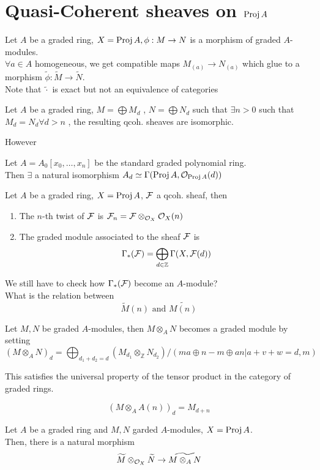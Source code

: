 \documentclass[../main.tex]{subfiles}
\begin{document}
\section{Quasi-Coherent sheaves on $\operatorname{Proj} A$ }
Let $A$ be a graded ring, $X= \operatorname{Proj} A, \phi:M\to N$ is a morphism of graded $A$-modules.\\
$\forall a \in A$ homogeneous, we get compatible maps $M_{( a) } \to N_{( a) } $ which glue to a morphism $\tilde\phi: \widetilde M \to \widetilde N$.\\
Note that $\widetilde { \cdot} $ is exact but not an equivalence of categories
\begin{exemple}
Let $A$ be a graded ring, $M= \bigoplus M_d$ , $N= \bigoplus N_d$ such that $\exists n>0$ such that $M_d= N_d \forall d>n$ , the resulting qcoh. sheaves are isomorphic.
\end{exemple}
However
\begin{propo}
Let $A= A_0 [ x_0,\ldots,x_n] $ be the standard graded polynomial ring.\\
Then $\exists$ a natural isomorphism $A_d \simeq \Gamma( \operatorname{Proj} A, \mathcal{O}_{\operatorname{Proj} A} ( d) ) $ 
\end{propo}
\begin{defn}
	Let $A$ be a graded ring, $X= \operatorname{Proj} A$, $\mathcal{F}$ a qcoh. sheaf, then 
	\begin{enumerate}
	\item The $n$-th twist of $\mathcal{F}$ is $\mathcal{F}_n = \mathcal{F} \otimes_{\mathcal{O}_X} \mathcal{O}_X( n) $ 
	\item The graded module associated to the sheaf $\mathcal{F}$ is
		\[ 
		\Gamma_\ast ( \mathcal{F}) = \bigoplus_{d\in \mathbb{Z}} \Gamma( X,\mathcal{F}( d) ) 
		\]
		
	\end{enumerate}
	
\end{defn}
We still have to check how $\Gamma_\ast( \mathcal{F}) $ become an $A$-module?\\
What is the relation between 
\[ 
	\widetilde{M}( n) \text{ and } \widetilde{M( n) }
\]
\begin{defn}
	Let $M,N$ be graded $A$-modules, then $M\otimes_A N$ becomes a graded module by setting
	\[ 
		( M\otimes_A N)_d = \bigoplus_{d_1+d_2 = d} ( M_{d_1} \otimes_\mathbb{Z}N_{d_2} ) / ( ma\oplus n - m \oplus an|a+v+w =d,m  ) 
	\]
\end{defn}
\begin{rmq}
This satisfies the universal property of the tensor product in the category of graded rings.
\end{rmq}
\begin{exemple}
\[ 
	( M\otimes_A A( n) )_d = M_{d+n} 
\]
\end{exemple}
\begin{lemma}
Let $A$ be a graded ring and $M,N$ garded $A$-modules, $X= \operatorname{Proj} A$.\\
Then, there is a natural morphism
\[ 
	\widetilde{M}\otimes_{\mathcal{O}_X} \widetilde{N} \to \widetilde{M\otimes_A N}
\]

\end{lemma}
\end{document}
